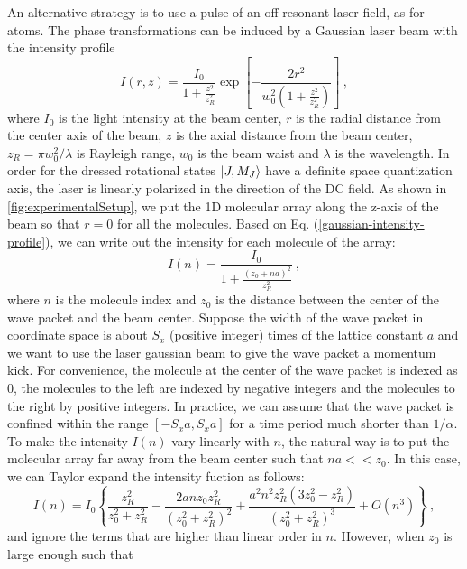 An alternative strategy is to use a pulse of an
off-resonant laser field, as for atoms. The phase transformations can be induced
by a Gaussian laser beam with the intensity profile
\begin{equation}
I(r, z) = \frac{I_0}{1+
\frac{z^2}{z_R^2}}\exp\left[-\frac{2r^2}{w_0^2\left (1+
\frac{z^2}{z_R^2}\right) }\right] \ ,
\label{gaussian-intensity-profile}
\end{equation}
where $I_0$ is the light intensity at the beam center, $r$ is the
radial distance from the center axis of the beam, $z$ is the axial
distance from the beam center,  $z_R=\pi w_0^2/\lambda$ is
Rayleigh range, $w_0$ is the beam waist and $\lambda$ is the wavelength.
In order for the dressed rotational states $| J, M_J \rangle$ have a definite space quantization axis, the laser is linearly polarized in the direction of the DC field. 
As shown in \autoref{fig:experimentalSetup}, we put the 1D molecular array  along the z-axis of
the beam so that $r=0$ for all the molecules. 
Based on Eq.
(\ref{gaussian-intensity-profile}), we can write out the
intensity for each molecule of the array:
\begin{equation}
I(n) = \frac{I_0}{1+ \frac{(z_0 + na)^2}{z_R^2}} \  ,
\label{gaussian-intensity-profile2}
\end{equation}
where $n$ is the molecule index and $z_0$ is the distance between
the center of the wave packet and the beam center.
Suppose the width of
the wave packet in coordinate space is about $S_x$ (positive
integer) times of the lattice constant $a$ and we want to use the
laser gaussian beam to give the wave packet a momentum kick. For
convenience,  the molecule at the center of the wave packet is
indexed as 0, the molecules to the left are indexed by negative
integers and  the molecules to the right by positive integers.  In
practice, we can assume that the wave packet is confined within
the range $[-S_x a, S_x a]$ for a time period much shorter than
$1/\alpha$.  
To make the intensity $I(n)$ vary linearly with $n$, the natural way is to put the molecular array far away from the beam center such that $na << z_0$.
In this case, we can Taylor expand the intensity fuction as follows:
\begin{equation}
I(n) =I_0\left\{ \frac{z_R^2}{z_0^2+z_R^2}-\frac{2 a n z_0 z_R^2}{\left(z_0^2+ z_R^2\right)^2}+\frac{a^2 n^2 z_R^2 \left(3 z_0^2-z_R^2\right)}{\left(z_0^2+z_R^2\right)^3}  + O(n^3)\right\} \ , \label{taylor-expansion}
\end{equation}
and ignore the terms that are higher than linear order in $n$. However, when $z_0$ is large enough such that
